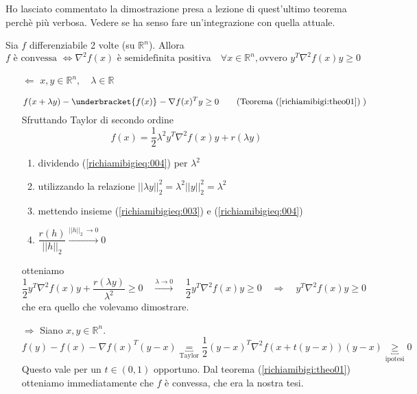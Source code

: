 \begin{todo}
Ho lasciato commentato la dimostrazione presa a lezione
di quest'ultimo teorema perch\`e pi\`u verbosa. Vedere se ha senso
 fare un'integrazione con quella attuale.
\end{todo}

\begin{theo}
\label{richiamibigi:theo02} 
Sia $f$ differenziabile 2 volte (su $\mathbb{R}^{n}$). Allora
 $$ f \text { è convessa } \Longleftrightarrow \nabla^{2} f(x) \text{ è semidefinita positiva} \quad \forall x \in \mathbb{R}^{n},
\text{ovvero } y^{T}\nabla^{2}f(x)y \geq 0
$$
\end{theo}

\begin{thproof}
\begin{itemize}
\item[$ \Longleftarrow$]
 $x,y \in \mathbb{R}^{n}, \quad \lambda  \in \mathbb{R}$

\begin{equation}
  \label{richiamibigieq:003}
f(x+ \lambda y) - \underbracket{f(x)}_{} -\nabla f(x)^{T}y \geq 0
\qquad (\text{Teorema } (\ref{richiamibigi:theo01})\;)   
\end{equation}
Sfruttando Taylor di secondo ordine
\begin{equation}
  \label{richiamibigieq:004}
  f(x) = \frac{1}{2} \lambda^{2} y^{T} \nabla^2 f(x) y + r(\lambda y)
\end{equation}
\begin{enumerate}
\item dividendo (\ref{richiamibigieq:004}) per $\lambda^{2}$
 \item utilizzando la relazione
$||\lambda y||_{2}^{2} = \lambda^{2} ||y||_{2}^{2} = \lambda^{2}$
 \item mettendo insieme (\ref{richiamibigieq:003})  e (\ref{richiamibigieq:004})
\item $\dfrac{r(h)}{||h||_{2}} \xrightarrow{|| h||_{2} \ \to 0} 0$
\end{enumerate}
otteniamo
$$ \frac{1}{2} y^{T} \nabla^{2}f(x) y   + \frac{r(\lambda y)}{\lambda^2}  \geq  0
\quad
\xrightarrow{\lambda \to 0} 
\quad
 \frac{1}{2} y^{T} \nabla^{2}f(x) y   \geq  0
\quad
\Longrightarrow \quad
y^{T} \nabla^{2} f(x) y \geq 0 
$$
che era quello che volevamo dimostrare.

\item[$\Longrightarrow$]
 Siano $x,y \in \mathbb{R}^{n}$. 
$$f(y) - f(x) - \nabla f(x)^{T}(y-x)
\underbracket{ =}_{\text{Taylor}} \frac{1}{2} (y-x)^{T} \nabla^{2} f(x + t(y-x))(y-x) \underbracket{\geq}_{\text{ipotesi}} 0$$
 Questo vale per un $t \in (0,1)$ opportuno.
Dal teorema (\ref{richiamibigi:theo01}) otteniamo immediatamente
che $f$ \`e convessa, che era la nostra tesi.
\end{itemize}
\end{thproof}

